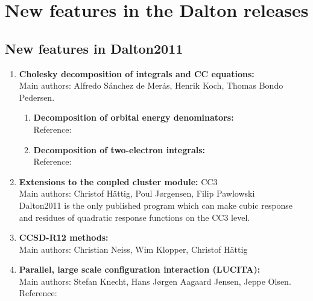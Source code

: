 \chapter{New features in the Dalton releases}

\section{New features in Dalton2011}

\begin{enumerate}

\item{\bf Cholesky decomposition of integrals and CC equations:} \\
Main authors: Alfredo S{\'a}nchez {de Mer{\'a}s}, Henrik Koch,
Thomas Bondo Pedersen.
\begin{enumerate}
  \item{\bf Decomposition of orbital energy denominators:}  \\
   Reference: 
   \cite{jcp_chopt}
  \item{\bf Decomposition of two-electron integrals:}  \\
   Reference: 
   \cite{choint}
\end{enumerate}

\item{\bf Extensions to the coupled cluster module:} CC3 \\
Main authors: Christof H\"{a}ttig, Poul J\o rgensen, Filip Pawlowski \\
Dalton2011 is the only published program which can make cubic response
and residues of quadratic response functions on the CC3 level.

\item{\bf CCSD-R12 methods:} \\
Main authors: Christian Neiss, Wim Klopper, Christof H\"{a}ttig

\item{\bf Parallel, large scale configuration interaction (LUCITA):} \\
Main authors: Stefan Knecht, Hans J\o rgen Aagaard Jensen, Jeppe Olsen.\\
Reference: 
\cite{knecht08}


\end{enumerate}
